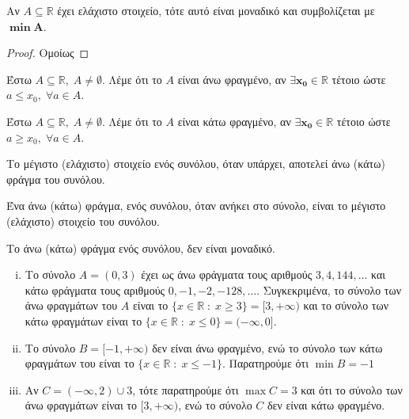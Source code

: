 \documentclass[main.tex]{subfiles}
\begin{document}
\begin{mypropbox}
  Αν $ A \subseteq \mathbb{R} $ έχει ελάχιστο στοιχείο, τότε αυτό είναι 
  μοναδικό και συμβολίζεται με $ \bm{\min A} $.
\end{mypropbox}

\begin{proof}
  Ομοίως 
\end{proof}

\begin{mydfnbox}
  Έστω $ A \subseteq \mathbb{R}, \; A \neq \emptyset $. Λέμε ότι το 
  $A$ είναι άνω φραγμένο, αν $ \bm{\exists x_{0} \in \mathbb{R}}$ τέτοιο ώστε 
  $ a \leq x_{0}, \; \forall a \in A$.
\end{mydfnbox}

\begin{mydfnbox}
  Έστω $ A \subseteq \mathbb{R}, \; A \neq \emptyset $. Λέμε ότι το 
  $A$ είναι κάτω φραγμένο, αν $ \bm{\exists x_{0} \in \mathbb{R}}$ τέτοιο ώστε 
  $ a \geq x_{0}, \; \forall a \in A $.
\end{mydfnbox}
\begin{rems}
\item {}
  \begin{myitemize}
    \item Το μέγιστο (ελάχιστο) στοιχείο ενός συνόλου, όταν υπάρχει, αποτελεί άνω
      (κάτω) φράγμα του συνόλου.
    \item Ένα  άνω (κάτω) φράγμα, ενός συνόλου, όταν ανήκει στο σύνολο, είναι 
      το μέγιστο (ελάχιστο) στοιχείο του συνόλου.
    \item Το άνω (κάτω) φράγμα ενός συνόλου, δεν είναι μοναδικό.
  \end{myitemize}
\end{rems}

\begin{example}
\item {}
  \begin{enumerate}[(i)]
    \item Το  σύνολο $ A = (0,3) $  έχει ως άνω φράγματα τους αριθμούς 
      $ 3, 4, 144, \ldots$ και κάτω φράγματα τους αριθμούς
      $ 0, -1, -2, -128, \ldots $. Συγκεκριμένα, το σύνολο των άνω φραγμάτων του 
      $A$ είναι το $ \{ x \in \mathbb{R} \; : \; x \geq 3 \} = [3,+\infty) $ και 
      το σύνολο των κάτω φραγμάτων είναι το 
      $ \{ x \in \mathbb{R} \; : \; x \leq 0 \} = (-\infty,0] $.

    \item Το σύνολο $ B = [-1,+\infty) $ δεν είναι άνω φραγμένο, ενώ το σύνολο των 
      κάτω φραγμάτων του είναι το $ \{ x \in \mathbb{R} \; : \; x \leq -1 \} $. 
      Παρατηρούμε ότι $ \min B =-1 $ 

    \item Αν $ C= (-\infty,2) \cup {3} $, τότε παρατηρούμε ότι $ \max C = 3 $ και ότι 
      το σύνολο των άνω φραγμάτων είναι το $[3,+\infty) $, ενώ το σύνολο $C$ δεν είναι 
      κάτω φραγμένο.
  \end{enumerate}
\end{example}
\end{document}
